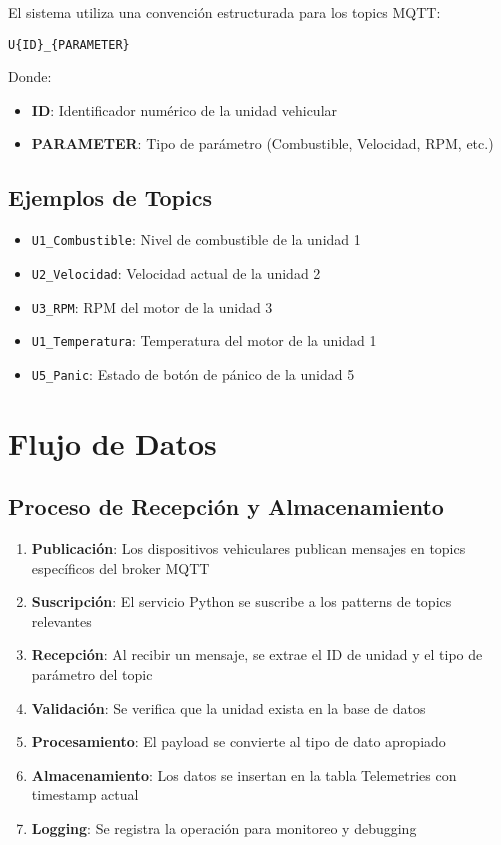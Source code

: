 El sistema utiliza una convención estructurada para los topics MQTT:

\texttt{U\{ID\}\_\{PARAMETER\}}

Donde:
\begin{itemize}[noitemsep]
    \item \textbf{ID}: Identificador numérico de la unidad vehicular
    \item \textbf{PARAMETER}: Tipo de parámetro (Combustible, Velocidad, RPM, etc.)
\end{itemize}

\subsection{Ejemplos de Topics}
\begin{itemize}[noitemsep]
    \item \texttt{U1\_Combustible}: Nivel de combustible de la unidad 1
    \item \texttt{U2\_Velocidad}: Velocidad actual de la unidad 2
    \item \texttt{U3\_RPM}: RPM del motor de la unidad 3
    \item \texttt{U1\_Temperatura}: Temperatura del motor de la unidad 1
    \item \texttt{U5\_Panic}: Estado de botón de pánico de la unidad 5
\end{itemize}

\section{Flujo de Datos}

\subsection{Proceso de Recepción y Almacenamiento}

\begin{enumerate}[noitemsep]
    \item \textbf{Publicación}: Los dispositivos vehiculares publican mensajes en topics específicos del broker MQTT
    
    \item \textbf{Suscripción}: El servicio Python se suscribe a los patterns de topics relevantes
    
    \item \textbf{Recepción}: Al recibir un mensaje, se extrae el ID de unidad y el tipo de parámetro del topic
    
    \item \textbf{Validación}: Se verifica que la unidad exista en la base de datos
    
    \item \textbf{Procesamiento}: El payload se convierte al tipo de dato apropiado
    
    \item \textbf{Almacenamiento}: Los datos se insertan en la tabla Telemetries con timestamp actual
    
    \item \textbf{Logging}: Se registra la operación para monitoreo y debugging
\end{enumerate}

